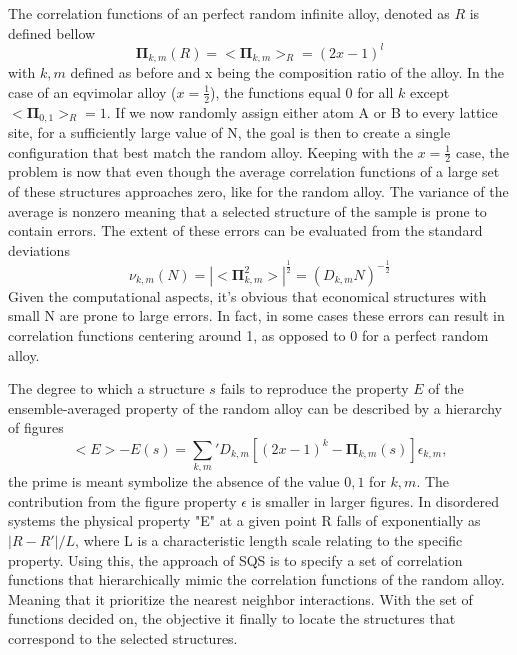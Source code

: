 The correlation functions of an perfect random infinite alloy, denoted as $R$ is defined bellow
\begin{equation}
    \boldsymbol{\Pi}_{k,m}(R) = <\boldsymbol{\Pi}_{k,m}>_R = (2x-1)^l 
\end{equation}
with $k, m$ defined as before and x being the composition ratio of the alloy. In the case of an eqvimolar alloy ($x=\frac{1}{2}$), the functions equal 0 for all $k$ except $<\boldsymbol{\Pi}_{0,1}>_R = 1$. If we now randomly assign either atom A or B to every lattice site, for a sufficiently large value of N, the goal is then to create a single configuration that best match the random alloy. Keeping with the $x=\frac{1}{2}$ case, the problem is now that even though the average correlation functions of a large set of these structures approaches zero, like for the random alloy. The variance of the average is nonzero meaning that a selected structure of the sample is prone to contain errors. The extent of these errors can be evaluated from the standard deviations
\begin{equation}
    \nu_{k,m}(N) = |<\boldsymbol{\Pi}^{2}_{k,m}>|^{\frac{1}{2}} = (D_{k,m}N)^{-\frac{1}{2}}
\end{equation}
Given the computational aspects, it's obvious that economical structures with small N are prone to large errors. In fact, in some cases these errors can result in correlation functions centering around 1, as opposed to 0 for a perfect random alloy.  

The degree to which a structure $s$ fails to reproduce the property $E$ of the ensemble-averaged property of the random alloy can be described by a hierarchy of figures
\begin{equation}
    <E> - E(s) = \sum_{k,m}' D_{k,m}[(2x-1)^k-\boldsymbol{\Pi}_{k,m}(s)]\epsilon_{k,m}, 
\end{equation}
the prime is meant symbolize the absence of the value $0,1$ for $k,m$. The contribution from the figure property $\epsilon$ is smaller in larger figures. In disordered systems the physical property "E" at a given point R falls of exponentially as $|R-R'|/L$, where L is a characteristic length scale relating to the specific property. Using this, the approach of SQS is to specify a set of correlation functions that hierarchically mimic the correlation functions of the random alloy. Meaning that it prioritize the nearest neighbor interactions. With the set of functions decided on, the objective it finally to locate the structures that correspond to the selected structures. 

